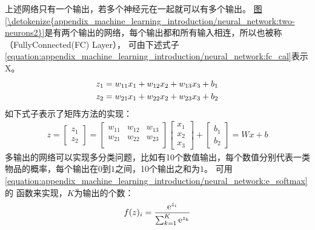 \documentclass[letterpaper,10pt,english]{sphinxmanual}
\begin{document}
\sphinxAtStartPar
上述网络只有一个输出，若多个神经元在一起就可以有多个输出。
\hyperref[\detokenize{appendix_machine_learning_introduction/neural_network:two-neurons2}]{图\ref{\detokenize{appendix_machine_learning_introduction/neural_network:two-neurons2}}}是有两个输出的网络，每个输出都和所有输入相连，所以也被称（Fully\sphinxhyphen{}Connected(FC)
Layer）， 可由下述式子 \eqref{equation:appendix_machine_learning_introduction/neural_network:fc_cal}表示X。
\begin{equation}\label{equation:appendix_machine_learning_introduction/neural_network:fc_cal}
\begin{split}z_{1} &= w_{11}x_{1} + w_{12}x_{2} + w_{13}x_{3} + b_1 \notag \\ z_{2} &= w_{21}x_{1} + w_{22}x_{2} + w_{23}x_{3} + b_2\end{split}
\end{equation}
\sphinxAtStartPar
如下式子表示了矩阵方法的实现：
\begin{equation}\label{equation:appendix_machine_learning_introduction/neural_network:appendix_machine_learning_introduction/neural_network:2}
\begin{split}{z} =
\begin{bmatrix}
z_1 \\
z_2
\end{bmatrix}
=
\begin{bmatrix}
w_{11} & w_{12} & w_{13}\\
w_{21} & w_{22} & w_{23}\\
\end{bmatrix}
\begin{bmatrix}
x_1\\
x_2\\
x_3
\end{bmatrix}
+
\begin{bmatrix}
b_1 \\ b_2
\end{bmatrix}
= {W}{x} + {b}\end{split}
\end{equation}
\sphinxAtStartPar
多输出的网络可以实现多分类问题，比如有10个数值输出，每个数值分别代表一类物品的概率，每个输出在\(0\)到\(1\)之间，10个输出之和为\(1\)。
可用 \eqref{equation:appendix_machine_learning_introduction/neural_network:e_softmax}的
函数来实现，\(K\)为输出的个数：
\begin{equation}\label{equation:appendix_machine_learning_introduction/neural_network:e_softmax}
\begin{split}f({z})_{i} = \frac{{\rm e}^{z_{i}}}{\sum_{k=1}^{K}{\rm e}^{z_{k}}}\end{split}
\end{equation}
\end{document}
